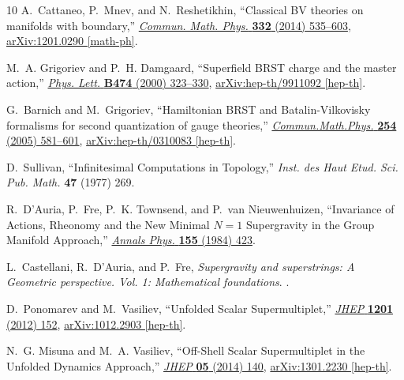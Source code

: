 \documentclass[a4paper,12pt]{article}
\numberwithin{equation}{section} %
\numberwithin{equation}{section}
\begin{document}
\begin{thebibliography}{10}
A.~Cattaneo, P.~Mnev, and N.~Reshetikhin, ``{Classical BV theories on manifolds with boundary},'' \href{http://dx.doi.org/10.1007/s00220-014-2145-3}{{\em Commun. Math. Phys.} {\bfseries 332} (2014) 535--603},
\href{http://arxiv.org/abs/1201.0290}{{\ttfamily arXiv:1201.0290 [math-ph]}}.

M.~A. Grigoriev and P.~H. Damgaard, ``{S}uperfield {BRST} charge and the master action,'' \href{http://dx.doi.org/10.1016/S0370-2693(00)00050-2}{{\em Phys. Lett.} {\bfseries B474} (2000) 323--330},
\href{http://arxiv.org/abs/hep-th/9911092}{{\ttfamily arXiv:hep-th/9911092 [hep-th]}}.

G.~Barnich and M.~Grigoriev, ``{H}amiltonian {BRST} and {B}atalin-{V}ilkovisky formalisms for second quantization of gauge theories,'' \href{http://dx.doi.org/10.1007/s00220-004-1275-4}{{\em Commun.Math.Phys.} {\bfseries 254} (2005) 581--601},
\href{http://arxiv.org/abs/hep-th/0310083}{{\ttfamily arXiv:hep-th/0310083 [hep-th]}}.

D.~Sullivan, ``{I}nfinitesimal {C}omputations in {T}opology,'' {\em Inst. des Haut Etud. Sci. Pub. Math.} {\bfseries 47} (1977) 269.

R.~D'Auria, P.~Fre, P.~K. Townsend, and P.~van Nieuwenhuizen, ``{Invariance of Actions, Rheonomy and the New Minimal $N=1$ Supergravity in the Group Manifold Approach},'' \href{http://dx.doi.org/10.1016/0003-4916(84)90007-1}{{\em Annals Phys.} {\bfseries 155} (1984) 423}.

L.~Castellani, R.~D'Auria, and P.~Fre, {\em {Supergravity and superstrings: A Geometric perspective. Vol. 1: Mathematical foundations}}.
.

D.~Ponomarev and M.~Vasiliev, ``{U}nfolded {S}calar {S}upermultiplet,'' \href{http://dx.doi.org/10.1007/JHEP01(2012)152}{{\em JHEP} {\bfseries 1201} (2012) 152},
\href{http://arxiv.org/abs/1012.2903}{{\ttfamily arXiv:1012.2903 [hep-th]}}.

N.~G. Misuna and M.~A. Vasiliev, ``{Off-Shell Scalar Supermultiplet in the Unfolded Dynamics Approach},'' \href{http://dx.doi.org/10.1007/JHEP05(2014)140}{{\em JHEP} {\bfseries 05} (2014) 140},
\href{http://arxiv.org/abs/1301.2230}{{\ttfamily arXiv:1301.2230 [hep-th]}}.


\end{thebibliography}
\end{document}
